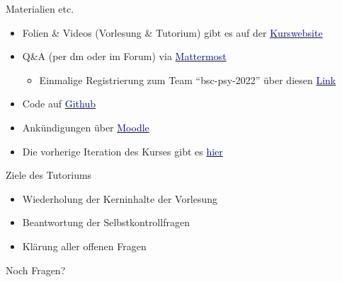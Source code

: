 \documentclass[
  8pt,
  ignorenonframetext,
]{beamer}
\providecommand{\tightlist}{%
  \setlength{\itemsep}{0pt}\setlength{\parskip}{0pt}}
\begin{document}
\begin{frame}{Materialien etc.}
\protect\hypertarget{materialien-etc.}{}

\begin{itemize}
\tightlist
\item
  Folien \& Videos (Vorlesung \& Tutorium) gibt es auf der
  \href{https://www.ipsy.ovgu.de/Institut/Abteilungen+des+Institutes/Methodenlehre+I+_+Experimentelle+und+Neurowissenschaftliche+Psychologie/Lehre/Sommersemester+2023/Allgemeines+Lineares+Modell.html}{\textcolor{darkblue}{Kurswebsite}}
\item
  Q\&A (per dm oder im Forum) via
  \href{https://mm.cs.ovgu.de/bsc-psy-2022/channels/b2-alm}{\textcolor{darkblue}{Mattermost}}

  \begin{itemize}
  \tightlist
  \item
    Einmalige Registrierung zum Team ``bsc-psy-2022'' über diesen
    \href{https://mm.cs.ovgu.de/signup_user_complete/?id=6zhrsn3oab8pdynz16gmqpm9ka}{\textcolor{darkblue}{Link}}
  \end{itemize}
\item
  Code auf
  \href{https://github.com/sean-mulready/ALM-Tut-23}{\textcolor{darkblue}{Github}}
\item
  Ankündigungen über
  \href{https://elearning.ovgu.de/course/view.php?id=14470}{\textcolor{darkblue}{Moodle}}
\item
  Die vorherige Iteration des Kurses gibt es
  \href{https://www.ipsy.ovgu.de/Institut/Abteilungen+des+Institutes/Methodenlehre+I+_+Experimentelle+und+Neurowissenschaftliche+Psychologie/Lehre/Sommersemester+2022/Allgemeines+Lineares+Modell.html}{\textcolor{darkblue}{hier}}
\end{itemize}
\end{frame}

\begin{frame}{Ziele des Tutoriums}
\protect\hypertarget{ziele-des-tutoriums}{}

\begin{itemize}
\tightlist
\item
  Wiederholung der Kerninhalte der Vorlesung
\item
  Beantwortung der Selbstkontrollfragen
\item
  Klärung aller offenen Fragen
\end{itemize}
\end{frame}

\begin{frame}[plain]{}
\protect\hypertarget{section-4}{}
\huge
\center
\vfill

Noch Fragen? \vfill
\end{frame}
\end{document}
